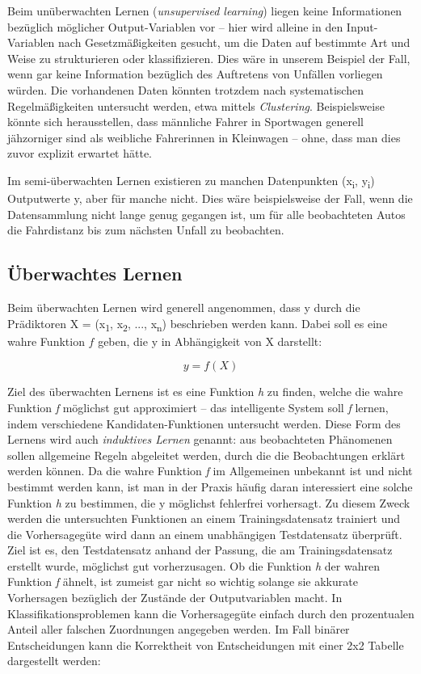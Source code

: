 \vspace{0.3cm}

Beim unüberwachten Lernen (\emph{unsupervised learning}) liegen keine Informationen
bezüglich möglicher Output-Variablen vor -- hier wird alleine in den Input-Variablen
nach Gesetzmäßigkeiten gesucht, um die Daten auf bestimmte Art und Weise zu
strukturieren oder klassifizieren. Dies wäre in unserem Beispiel der Fall, wenn gar
keine Information bezüglich des Auftretens von Unfällen vorliegen würden. Die
vorhandenen Daten könnten trotzdem nach systematischen Regelmäßigkeiten untersucht
werden, etwa mittels \emph{Clustering}. Beispielsweise könnte sich herausstellen,
dass männliche Fahrer in Sportwagen generell jähzorniger sind als weibliche
Fahrerinnen in Kleinwagen -- ohne, dass man dies zuvor explizit erwartet hätte.

Im semi-überwachten Lernen existieren zu manchen Datenpunkten (x\textsubscript{i},
y\textsubscript{i}) Outputwerte y, aber für manche nicht. Dies wäre beispielsweise
der Fall, wenn die Datensammlung nicht lange genug gegangen ist, um für alle
beobachteten Autos die Fahrdistanz bis zum nächsten Unfall zu beobachten.

\subsection{Überwachtes Lernen}

Beim überwachten Lernen wird generell angenommen, dass y durch die Prädiktoren X =
(x\textsubscript{1}, x\textsubscript{2}, ..., x\textsubscript{n}) beschrieben werden
kann. Dabei soll es eine wahre Funktion $f$ geben, die y in Abhängigkeit von X
darstellt:

\begin{equation*}
y = f(X)
\end{equation*}


Ziel des überwachten Lernens ist es eine Funktion \emph{h} zu finden, welche die
wahre Funktion \emph{f} möglichst gut approximiert -- das intelligente System soll
\emph{f} lernen, indem verschiedene Kandidaten-Funktionen untersucht werden. Diese
Form des Lernens wird auch \emph{induktives Lernen} genannt: aus beobachteten
Phänomenen sollen allgemeine Regeln abgeleitet werden, durch die die Beobachtungen
erklärt werden können. Da die wahre Funktion \emph{f} im Allgemeinen unbekannt ist
und nicht bestimmt werden kann, ist man in der Praxis häufig daran interessiert eine
solche Funktion \emph{h} zu bestimmen, die y möglichst fehlerfrei vorhersagt. Zu
diesem Zweck werden die untersuchten Funktionen an einem Trainingsdatensatz
trainiert und die Vorhersagegüte wird dann an einem unabhängigen Testdatensatz
überprüft. Ziel ist es, den Testdatensatz anhand der Passung, die am
Trainingsdatensatz erstellt wurde, möglichst gut vorherzusagen.  Ob die Funktion
\emph{h} der wahren Funktion \emph{f} ähnelt, ist zumeist gar nicht so wichtig
solange sie akkurate Vorhersagen bezüglich der Zustände der Outputvariablen macht. In
Klassifikationsproblemen kann die Vorhersagegüte einfach durch den prozentualen
Anteil aller falschen Zuordnungen angegeben werden. Im Fall binärer Entscheidungen
kann die Korrektheit von Entscheidungen mit einer 2x2 Tabelle dargestellt werden:

